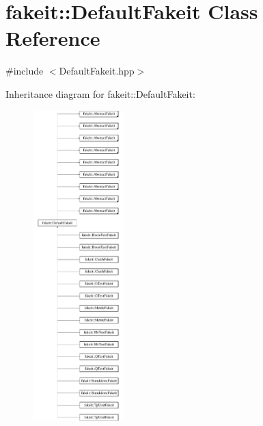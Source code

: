 \hypertarget{classfakeit_1_1DefaultFakeit}{}\section{fakeit\+::Default\+Fakeit Class Reference}
\label{classfakeit_1_1DefaultFakeit}


{\ttfamily \#include $<$Default\+Fakeit.\+hpp$>$}

Inheritance diagram for fakeit\+::Default\+Fakeit\+:\begin{figure}[H]
\begin{center}
\leavevmode
\includegraphics[height=12.000000cm]{classfakeit_1_1DefaultFakeit}
\end{center}
\end{figure}
